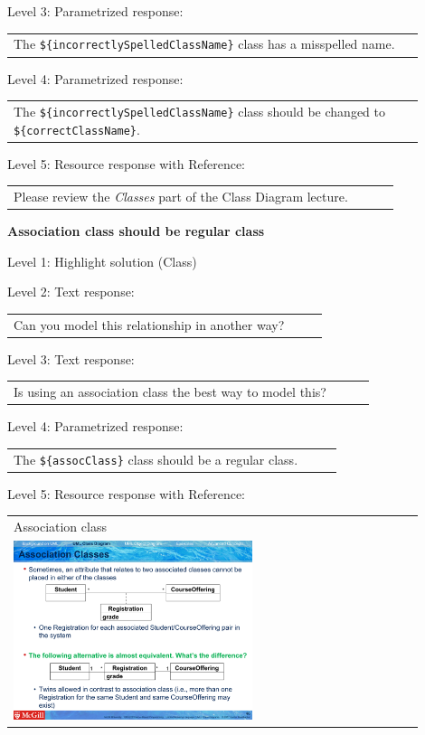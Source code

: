 \noindent Level 3: Parametrized response: \medskip

\begin{tabular}{|p{0.9\linewidth}}
The \verb|${incorrectlySpelledClassName}| class has a misspelled name.
\end{tabular} \medskip

\noindent Level 4: Parametrized response: \medskip

\begin{tabular}{|p{0.9\linewidth}}
The \verb|${incorrectlySpelledClassName}| class should be changed to \verb|${correctClassName}|.
\end{tabular} \medskip

\noindent Level 5: Resource response with Reference: \medskip

\begin{tabular}{|p{0.9\linewidth}}
Please review the \textit{Classes} part of the Class Diagram lecture.
\end{tabular} \medskip


\noindent \textbf{Association class should be regular class} \medskip

\noindent Level 1: Highlight solution (Class) \medskip

\noindent Level 2: Text response: \medskip

\begin{tabular}{|p{0.9\linewidth}}
Can you model this relationship in another way?
\end{tabular} \medskip

\noindent Level 3: Text response: \medskip

\begin{tabular}{|p{0.9\linewidth}}
Is using an association class the best way to model this?
\end{tabular} \medskip

\noindent Level 4: Parametrized response: \medskip

\begin{tabular}{|p{0.9\linewidth}}
The \verb|${assocClass}| class should be a regular class.
\end{tabular} \medskip

\noindent Level 5: Resource response with Reference: \medskip

\begin{tabular}{|p{0.9\linewidth}}
Association class

\\
\includegraphics[width=0.6\textwidth]{images/association_class.png}
\end{tabular} \medskip


